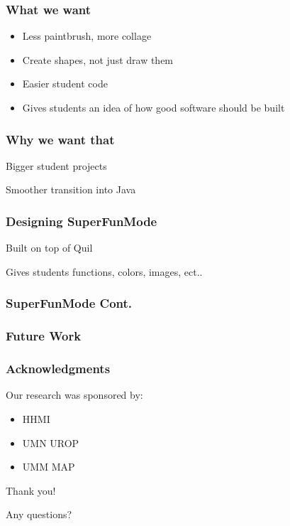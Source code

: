 \documentclass{beamer}
\begin{document}
\begin{frame}
	\frametitle{What we want}
	\begin{itemize}
		\item Less paintbrush, more collage
		\item Create shapes, not just draw them
		\item Easier student code
		\item Gives students an idea of how good software should be built              
	\end{itemize}
\end{frame}

\begin{frame}
	\frametitle{Why we want that}
	\item Bigger student projects
	\item Smoother transition into Java
\end{frame}

\begin{frame}
	\frametitle{Designing SuperFunMode}
	\item Built on top of Quil
	\item Gives students functions, colors, images, ect..
\end{frame}

\begin{frame}
	\frametitle{SuperFunMode Cont.}
\end{frame}

\begin{frame}
	\frametitle{Future Work}
\end{frame}




\begin{frame}
\frametitle{Acknowledgments}
	Our research was sponsored by:
	\begin{itemize}
	\item HHMI
	\item UMN UROP
	\item UMM MAP
	\end{itemize}
	{\centering
	\noindent
	Thank you! \par
	Any questions? \par
	}
\end{frame}
\end{document}
